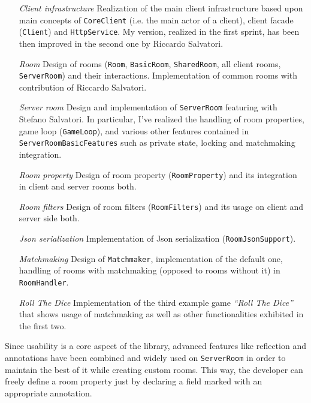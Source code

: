 \begin{itemize}

\item[\em{Client infrastructure}] Realization of the main client infrastructure based upon main concepts of \texttt{CoreClient} (i.e. the main actor of a client), client facade (\texttt{Client}) and \texttt{HttpService}. My version, realized in the first sprint, has been then improved in the second one by Riccardo Salvatori.

\item[\em{Room}] Design of rooms (\texttt{Room}, \texttt{BasicRoom}, \texttt{SharedRoom}, all client rooms, \texttt{ServerRoom}) and their interactions. Implementation of common rooms with contribution of Riccardo Salvatori.

\item[\em{Server room}] Design and implementation of \texttt{ServerRoom} featuring with Stefano Salvatori. In particular, I've realized the handling of room properties, game loop (\texttt{GameLoop}), and various other features contained in \texttt{ServerRoomBasicFeatures} such as private state, locking and matchmaking integration.

\item[\em{Room property}] Design of room property (\texttt{RoomProperty}) and its integration in client and server rooms both.

\item[\em{Room filters}] Design of room filters (\texttt{RoomFilters}) and its usage on client and server side both.

\item[\em{Json serialization}] Implementation of Json serialization (\texttt{RoomJsonSupport}).

\item[\em{Matchmaking}] Design of \texttt{Matchmaker}, implementation of the default one, handling of rooms with matchmaking (opposed to rooms without it) in \texttt{RoomHandler}.

\item[\em{Roll The Dice}] Implementation of the third example game \textit{``Roll The Dice''} that shows usage of matchmaking as well as other functionalities exhibited in the first two.

\end{itemize}

Since usability is a core aspect of the library, advanced features like reflection and annotations have been combined and widely used on \texttt{ServerRoom} in order to maintain the best of it while creating custom rooms. This way, the developer can freely define a room property just by declaring a field marked with an appropriate annotation.




